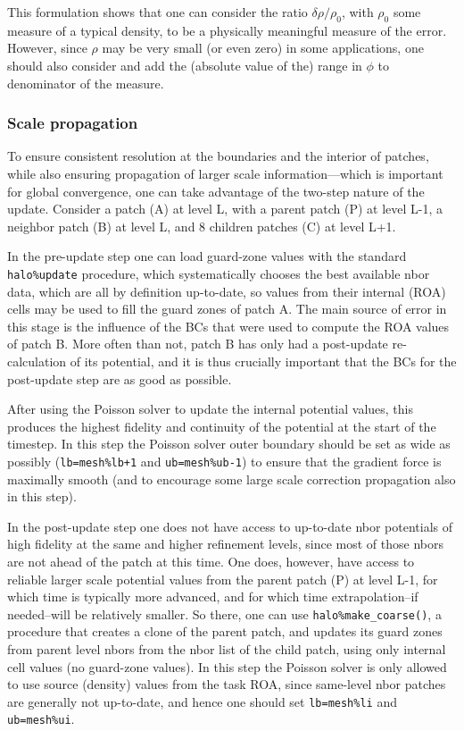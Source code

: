 \documentclass[paper=a4,fontsize=11pt]{scrartcl}
\numberwithin{equation}{section}		%
\numberwithin{figure}{section}			%
\numberwithin{table}{section}				%
\begin{document}
This formulation shows that one can consider the ratio $\delta\rho/\rho_0$, with $\rho_0$ some measure of a typical density, to be a physically meaningful measure of the error.   However, since $\rho$ may be very small (or even zero) in some applications, one should also consider and add the (absolute value of the) range in $\phi$ to denominator of the measure.

\subsubsection{Scale propagation}
To ensure consistent resolution at the boundaries and the interior of patches, while also ensuring propagation of larger scale information---which is important for global convergence, one can take advantage of the two-step nature of the update.  Consider a patch (A) at level L, with a parent patch (P) at level L-1, a neighbor patch (B) at level L, and 8 children patches (C) at level L+1.

In the pre-update step one can load guard-zone values with the standard \verb|halo%update| procedure, which systematically chooses the best available nbor data, which are all by definition up-to-date, so values from their internal (ROA) cells may be used to fill the guard zones of patch A.  The main source of error in this stage is the influence of the BCs that were used to compute the ROA values of patch B.  More often than not, patch B has only had a post-update re-calculation of its potential, and it is thus crucially important that the BCs for the post-update step are as good as possible.

After using the Poisson solver to update the internal potential values, this produces the highest fidelity and continuity of the potential at the start of the timestep.  In this step the Poisson solver outer boundary should be set as wide as possibly (\verb|lb=mesh%lb+1| and \verb|ub=mesh%ub-1|) to ensure that the gradient force is maximally smooth (and to encourage some large scale correction propagation also in this step).

In the post-update step one does not have access to up-to-date nbor potentials of high fidelity at the same and higher refinement levels, since most of those nbors are not ahead of the patch at this time.  One does, however, have access to reliable larger scale potential values from the parent patch (P) at level L-1, for which time is typically more advanced, and for which time extrapolation--if needed--will be relatively smaller.  So there, one can use \verb|halo%make_coarse()|, a procedure that creates a clone of the parent patch, and updates its guard zones from parent level nbors from the nbor list of the child patch, using only internal cell values (no guard-zone values).   In this step the Poisson solver is only allowed to use source (density) values from the task ROA, since same-level nbor patches are generally not up-to-date, and hence one should set \verb|lb=mesh%li| and \verb|ub=mesh%ui|.
\end{document}
